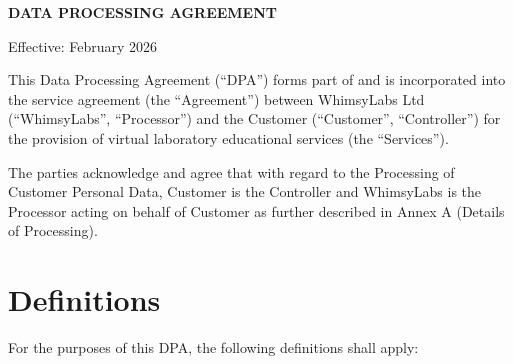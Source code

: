 \documentclass[11pt,a4paper]{article}
\begin{document}
\begin{center}
{\Large\bfseries DATA PROCESSING AGREEMENT}

\vspace{0.5cm}

{\small Effective: February 2026}
\end{center}

\vspace{1cm}

This Data Processing Agreement (``DPA'') forms part of and is incorporated into the service agreement (the ``Agreement'') between WhimsyLabs Ltd (``WhimsyLabs'', ``Processor'') and the Customer (``Customer'', ``Controller'') for the provision of virtual laboratory educational services (the ``Services'').

The parties acknowledge and agree that with regard to the Processing of Customer Personal Data, Customer is the Controller and WhimsyLabs is the Processor acting on behalf of Customer as further described in Annex A (Details of Processing).

\section{Definitions}

For the purposes of this DPA, the following definitions shall apply:
\end{document}

